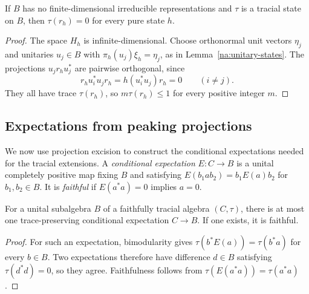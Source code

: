 \begin{lemma}\label{na:trace-null}
If $B$ has no finite-dimensional irreducible representations and $\tau$ is
a tracial state on $B$, then $\tau(r_h)=0$ for every pure state $h$.
\end{lemma}
\begin{proof}
The space $H_h$ is infinite-dimensional.  Choose orthonormal unit vectors
$\eta_j$ and unitaries $u_j\in B$ with $\pi_h(u_j)\xi_h=\eta_j$, as in
Lemma~\ref{na:unitary-states}.  The projections $u_jr_hu_j^*$ are
pairwise orthogonal, since
\[
 r_hu_i^*u_jr_h=h(u_i^*u_j)r_h=0\qquad(i\ne j).
\]
They all have trace $\tau(r_h)$, so $m\tau(r_h)\le1$ for every positive
integer $m$.
\end{proof}

\subsection{Expectations from peaking projections}

We now use projection excision to construct the conditional expectations
needed for the tracial extensions.  A \emph{conditional expectation}
$E:C\to B$ is a unital completely positive map fixing $B$ and satisfying
$E(b_1ab_2)=b_1E(a)b_2$ for $b_1,b_2\in B$.  It is \emph{faithful} if
$E(a^*a)=0$ implies $a=0$.

\begin{lemma}\label{na:trace-expectation}
For a unital subalgebra $B$ of a faithfully tracial algebra $(C,\tau)$,
there is at most one trace-preserving conditional expectation $C\to B$.
If one exists, it is faithful.
\end{lemma}
\begin{proof}
For such an expectation, bimodularity gives
$\tau(b^*E(a))=\tau(b^*a)$ for every $b\in B$.  Two expectations therefore
have difference $d\in B$ satisfying $\tau(d^*d)=0$, so they agree.
Faithfulness follows from $\tau(E(a^*a))=\tau(a^*a)$.
\end{proof}

